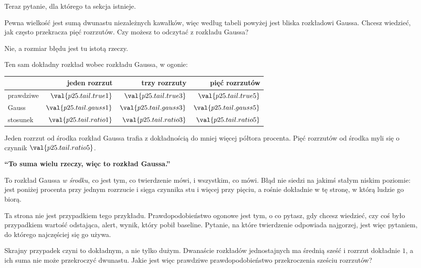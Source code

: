 \begin{fr}
Teraz pytanie, dla którego ta sekcja istnieje.

Pewna wielkość jest sumą dwunastu niezależnych kawałków, więc według tabeli
powyżej jest bliska rozkładowi Gaussa. Chcesz wiedzieć, jak często przekracza
pięć rozrzutów. Czy możesz to odczytać z rozkładu Gaussa?
\dotline
\nextframe
\end{fr}

\begin{fr}
\begin{ansblock}
Nie, a rozmiar błędu jest tu istotą rzeczy.
\end{ansblock}

Ten sam dokładny rozkład wobec rozkładu Gaussa, w ogonie:

\begin{center}
\begin{tabular}{lrrr}
\toprule
& jeden rozrzut & trzy rozrzuty & pięć rozrzutów \\
\midrule
prawdziwe & $\val{p25.tail.true1}$ & $\val{p25.tail.true3}$ &
      $\val{p25.tail.true5}$ \\
Gauss & $\val{p25.tail.gauss1}$ & $\val{p25.tail.gauss3}$ &
      $\val{p25.tail.gauss5}$ \\
stosunek & $\val{p25.tail.ratio1}$ & $\val{p25.tail.ratio3}$ &
      $\val{p25.tail.ratio5}$ \\
\bottomrule
\end{tabular}
\end{center}

Jeden rozrzut od środka rozkład Gaussa trafia z dokładnością do mniej więcej
półtora procenta. Pięć rozrzutów od środka myli się o czynnik
$\val{p25.tail.ratio5}$.
\end{fr}

\begin{fr}
\begin{trapbox}
\textbf{\enquote{To suma wielu rzeczy, więc to rozkład Gaussa.}}

To rozkład Gaussa \emph{w środku}, co jest tym, co twierdzenie mówi, i
wszystkim, co mówi. Błąd nie siedzi na jakimś stałym niskim poziomie: jest
poniżej procenta przy jednym rozrzucie i sięga czynnika stu i więcej przy
pięciu, a rośnie dokładnie w tę stronę, w którą ludzie go biorą.

Ta strona nie jest przypadkiem tego przykładu. Prawdopodobieństwo ogonowe
jest tym, o co pytasz, gdy chcesz wiedzieć, czy coś było przypadkiem \dash{}
wartość odstająca, alert, wynik, który pobił baseline. Pytanie, na które
twierdzenie odpowiada najgorzej, jest więc pytaniem, do którego najczęściej
się go używa.
\end{trapbox}

Skrajny przypadek czyni to dokładnym, a nie tylko dużym. Dwanaście rozkładów
jednostajnych ma średnią sześć i rozrzut dokładnie $1$, a ich suma nie może
przekroczyć dwunastu. Jakie jest więc prawdziwe prawdopodobieństwo
przekroczenia sześciu rozrzutów?
\dotline
\nextframe
\end{fr}

